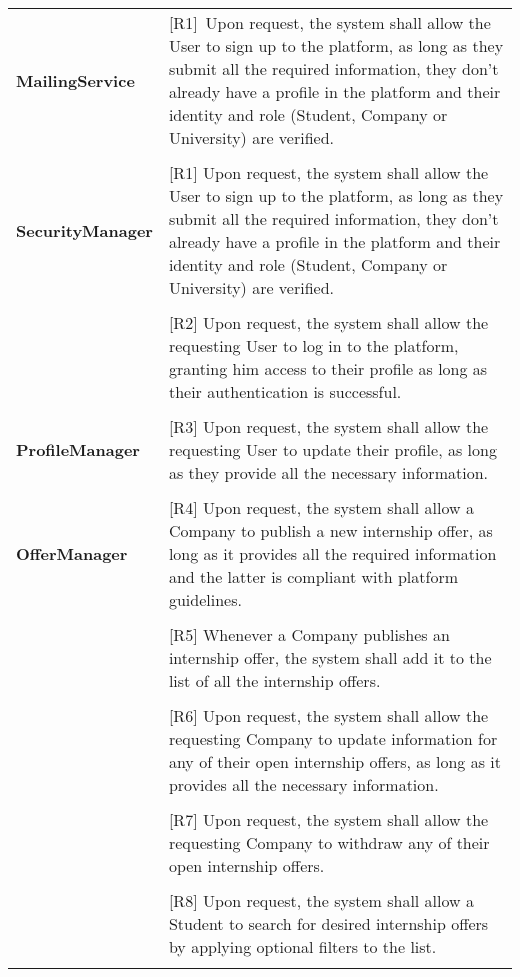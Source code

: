 \begin{center}
    \begin{longtable}{p{0.3\linewidth}p{0.7\linewidth}}
        \hline
        \textbf{MailingService}                 & [R1]\ Upon request, the system shall allow the User to sign up to the platform, as long as they submit all the required information, they don’t already have a profile in the platform and their identity and role (Student, Company or University) are verified. \\ \\
        \hline
        \textbf{SecurityManager}                 & [R1] Upon request, the system shall allow the User to sign up to the platform, as long as they submit all the required information, they don’t already have a profile in the platform and their identity and role (Student, Company or University) are verified. \\ \\
        & [R2] Upon request, the system shall allow the requesting User to log in to the platform, granting him access to their profile as long as their authentication is successful. \\ \\
        \hline
        \textbf{ProfileManager}             & [R3] Upon request, the system shall allow the requesting User to update their profile, as long as they provide all the necessary information. \\ \\
        \hline
        \textbf{OfferManager}                        & [R4] Upon request, the system shall allow a Company to publish a new internship offer, as long as it provides all the required information and the latter is compliant with platform guidelines. \\ \\     
        & [R5] Whenever a Company publishes an internship offer, the system shall add it to the list of all the internship offers. \\ \\
        & [R6] Upon request, the system shall allow the requesting Company to update information for any of their open internship offers, as long as it provides all the necessary information. \\ \\
        & [R7] Upon request, the system shall allow the requesting Company to withdraw any of their open internship offers. \\ \\
        & [R8] Upon request, the system shall allow a Student to search for desired internship offers by applying optional filters to the list. \\ \\

\end{longtable}
\end{center}
